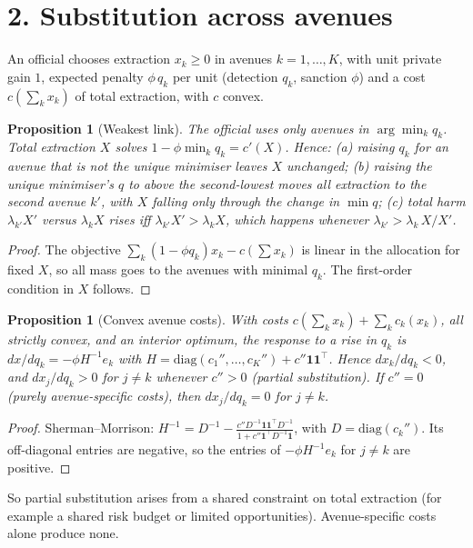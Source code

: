 \documentclass[11pt]{article}
\newtheorem{proposition}[theorem]{Proposition}
\theoremstyle{definition}
\begin{document}
\section*{2. Substitution across avenues}
An official chooses extraction $x_k\ge0$ in avenues $k=1,\dots,K$, with unit private gain $1$, expected penalty $\phi\,q_k$
per unit (detection $q_k$, sanction $\phi$) and a cost $c(\sum_kx_k)$ of total extraction, with $c$ convex.
\begin{proposition}[Weakest link]\label{prop:wl}
The official uses only avenues in $\arg\min_kq_k$. Total extraction $X$ solves $1-\phi\min_kq_k=c'(X)$. Hence:
(a) raising $q_k$ for an avenue that is not the unique minimiser leaves $X$ unchanged;
(b) raising the unique minimiser's $q$ to above the second-lowest moves all extraction to the second avenue $k'$, with $X$
falling only through the change in $\min q$;
(c) total harm $\lambda_{k'}X'$ versus $\lambda_kX$ rises iff $\lambda_{k'}X'>\lambda_kX$, which happens whenever
$\lambda_{k'}>\lambda_k\,X/X'$.
\end{proposition}
\begin{proof}
The objective $\sum_k(1-\phi q_k)x_k-c(\sum x_k)$ is linear in the allocation for fixed $X$, so all mass goes to the
avenues with minimal $q_k$. The first-order condition in $X$ follows.
\end{proof}
\begin{proposition}[Convex avenue costs]\label{prop:convex}
With costs $c(\sum_kx_k)+\sum_kc_k(x_k)$, all strictly convex, and an interior optimum, the response to a rise in $q_k$ is
$dx/dq_k=-\phi H^{-1}e_k$ with $H=\mathrm{diag}(c_1'',\dots,c_K'')+c''\mathbf 1\mathbf 1^\top$. Hence $dx_k/dq_k<0$, and
$dx_j/dq_k>0$ for $j\ne k$ whenever $c''>0$ (partial substitution). If $c''=0$ (purely avenue-specific costs), then
$dx_j/dq_k=0$ for $j\ne k$.
\end{proposition}
\begin{proof}
Sherman--Morrison: $H^{-1}=D^{-1}-\frac{c''D^{-1}\mathbf 1\mathbf 1^\top D^{-1}}{1+c''\mathbf 1^\top D^{-1}\mathbf 1}$, with
$D=\mathrm{diag}(c_k'')$. Its off-diagonal entries are negative, so the entries of $-\phi H^{-1}e_k$ for $j\ne k$ are positive.
\end{proof}
So partial substitution arises from a shared constraint on total extraction (for example a shared risk budget or limited
opportunities). Avenue-specific costs alone produce none.
\end{document}
